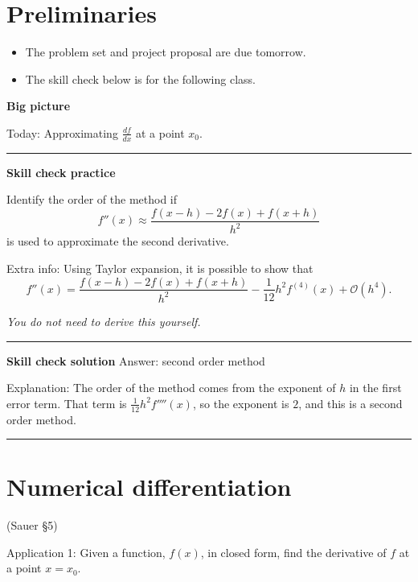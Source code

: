 \documentclass[12pt,letterpaper,noanswers]{exam}
\begin{document}
 \pdfpageheight 11in 
  \pdfpagewidth 8.5in

\noindent 

\section*{Preliminaries}

\begin{itemize}
\itemsep0pt
\item The problem set and project proposal are due tomorrow.
\item The skill check below is for the following class.
\end{itemize}


\noindent\textbf{Big picture}

Today: Approximating $\frac{df}{dx}$ at a point $x_0$.

\vspace{0.2cm}
\hrule
\vspace{0.2cm}

\noindent \textbf{Skill check practice}

Identify the order of the method if 
\[f''(x) \approx \frac{f(x-h)-2f(x)+f(x+h)}{h^2}\]
is used to approximate the second derivative.

\noindent Extra info: Using Taylor expansion, it is possible to show that \[f''(x) = \frac{f(x-h)-2f(x)+f(x+h)}{h^2} - \frac{1}{12}h^2 f^{(4)}(x) + \mathcal{O}(h^4).\]

\emph{You do not need to derive this yourself.}


\vspace{0.2cm}
\hrule
\vspace{0.2cm}

\noindent \textbf{Skill check solution}
Answer: second order method

Explanation: The order of the method comes from the exponent of $h$ in the first error term.  That term is $\frac{1}{12}h^2f''''(x)$, so the exponent is $2$, and this is a second order method.

\vspace{0.2cm}
\hrule
\vspace{0.2cm}


\section*{Numerical differentiation}

(Sauer \S 5)

\noindent Application 1: Given a function, $f(x)$, in closed form, find the derivative of $f$ at a point $x = x_0$. 
\end{document}
